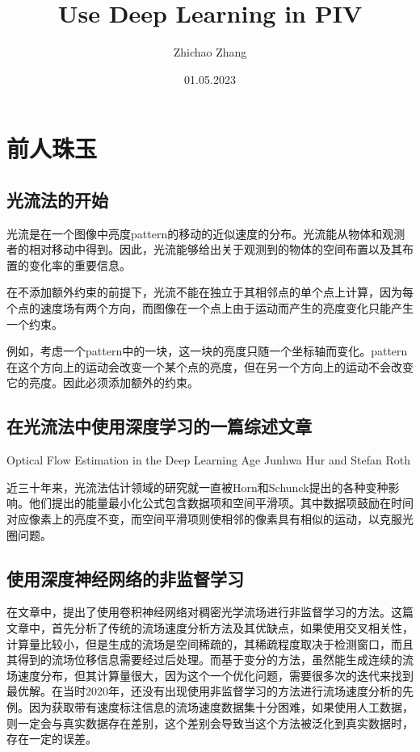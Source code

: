 \documentclass[UTF8]{ctexart}
\title{Use Deep Learning in PIV}  %
\author{Zhichao Zhang}  %
\date{01.05.2023}  %
\begin{document}
\maketitle
\tableofcontents

\section{前人珠玉}

\subsection{光流法的开始}

光流是在一个图像中亮度pattern的移动的近似速度的分布。光流能从物体和观测者的相对移动中得到。因此，光流能够给出关于观测到的物体的空间布置以及其布置的变化率的重要信息。

在不添加额外约束的前提下，光流不能在独立于其相邻点的单个点上计算，因为每个点的速度场有两个方向，而图像在一个点上由于运动而产生的亮度变化只能产生一个约束。

例如，考虑一个pattern中的一块，这一块的亮度只随一个坐标轴而变化。pattern在这个方向上的运动会改变一个某个点的亮度，但在另一个方向上的运动不会改变它的亮度。因此必须添加额外的约束。



\subsection{在光流法中使用深度学习的一篇综述文章}

Optical Flow Estimation in the Deep Learning Age Junhwa Hur and Stefan Roth

近三十年来，光流法估计领域的研究就一直被Horn和Schunck提出的各种变种影响。他们提出的能量最小化公式包含数据项和空间平滑项。其中数据项鼓励在时间对应像素上的亮度不变，而空间平滑项则使相邻的像素具有相似的运动，以克服光圈问题。



\subsection{使用深度神经网络的非监督学习}

在文章\cite{zhang_unsupervised_2020}中，提出了使用卷积神经网络对稠密光学流场进行非监督学习的方法。这篇文章中，首先分析了传统的流场速度分析方法及其优缺点，如果使用交叉相关性，计算量比较小，但是生成的流场是空间稀疏的，其稀疏程度取决于检测窗口，而且其得到的流场位移信息需要经过后处理。而基于变分的方法，虽然能生成连续的流场速度分布，但其计算量很大，因为这个一个优化问题，需要很多次的迭代来找到最优解。在当时2020年，还没有出现使用非监督学习的方法进行流场速度分析的先例。因为获取带有速度标注信息的流场速度数据集十分困难，如果使用人工数据，则一定会与真实数据存在差别，这个差别会导致当这个方法被泛化到真实数据时，存在一定的误差。
\end{document}
